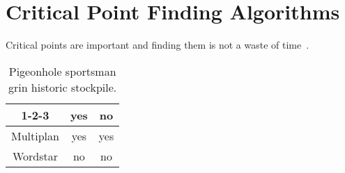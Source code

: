 \documentclass[../../thesis.tex]{subfiles}
\begin{document}
\chapter{Critical Point Finding Algorithms}

Critical points are important and finding them is not a waste of time~\cite{pennington2017}.

\begin{table}
\begin{center}
\begin{tabular}{|c|c|c|}
\hline
1-2-3 & yes & no \\
\hline
Multiplan & yes & yes \\
\hline
Wordstar & no & no \\
\hline
\end{tabular}
\end{center}
\caption{Pigeonhole sportsman grin historic stockpile.}
\end{table}

\onlyinsubfile{\printbibliography}
\end{document}

